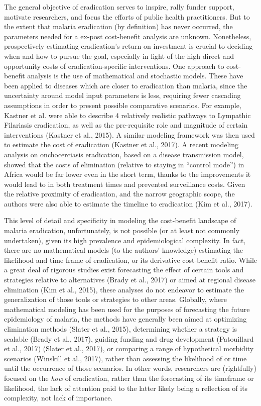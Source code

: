 \documentclass[]{article}
\begin{document}
The general objective of eradication serves to inspire, rally funder
support, motivate researchers, and focus the efforts of public health
practitioners. But to the extent that malaria eradication (by
definition) has never occurred, the parameters needed for a ex-post
cost-benefit analysis are unknown. Nonetheless, prospectively estimating
eradication's return on investment is crucial to deciding when and how
to pursue the goal, especially in light of the high direct and
opportunity costs of eradication-specific interventions. One approach to
cost-benefit analysis is the use of mathematical and stochastic models.
These have been applied to diseases which are closer to eradication than
malaria, since the uncertainty around model input parameters is less,
requiring fewer cascading assumptions in order to present possible
comparative scenarios. For example, Kastner et al. were able to describe
4 relatively realistic pathways to Lympathic Filariasis eradication, as
well as the pre-requisite role and magnitude of certain interventions
(Kastner et al., 2015). A similar modeling framework was then used to
estimate the cost of eradication (Kastner et al., 2017). A recent
modeling analysis on onchocerciasis eradication, based on a disease
transmission model, showed that the costs of elimination (relative to
staying in ``control mode'') in Africa would be far lower even in the
short term, thanks to the improvements it would lead to in both
treatment times and prevented surveillance costs. Given the relative
proximity of eradication, and the narrow geographic scope, the authors
were also able to estimate the timeline to eradication (Kim et al.,
2017).

This level of detail and specificity in modeling the cost-benefit
landscape of malaria eradication, unfortunately, is not possible (or at
least not commonly undertaken), given its high prevalence and
epidemiological complexity. In fact, there are no mathematical models
(to the authors' knowledge) estimating the likelihood and time frame of
eradication, or its derivative cost-benefit ratio. While a great deal of
rigorous studies exist forecasting the effect of certain tools and
strategies relative to alternatives (Brady et al., 2017) or aimed at
regional disease elimination (Kim et al., 2015), these analyses do not
endeavor to estimate the generalization of those tools or strategies to
other areas. Globally, where mathematical modeling has been used for the
purposes of forecasting the future epidemiology of malaria, the methods
have generally been aimed at optimizing elimination methods (Slater et
al., 2015), determining whether a strategy is scalable (Brady et al.,
2017), guiding funding and drug development (Patouillard et al., 2017)
(Slater et al., 2017), or comparing a range of hypothetical morbidity
scenarios (Winskill et al., 2017), rather than assessing the likelihood
of or time until the occurrence of those scenarios. In other words,
researchers are (rightfully) focused on the \emph{how} of eradication,
rather than the forecasting of its timeframe or likelihood, the lack of
attention paid to the latter likely being a reflection of its
complexity, not lack of importance.
\end{document}
